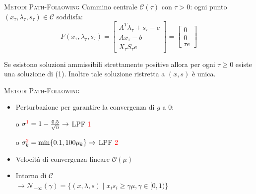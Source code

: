 \begin{frame}[t]{\textsc{\LARGE \textcolor{burntumber}{Metodi Path-Following}}}
	Cammino centrale $\mathcal{C}(\tau)$ con $\tau  > 0$: ogni punto $(x_{\tau}, \lambda_{\tau}, s_{\tau})\in \mathcal{C}$ soddisfa:
\begin{equation}\label{Ftao}\tag{1}
\mathit{F}(x_{\tau},\lambda_{\tau},s_{\tau})= \begin{bmatrix}
A^{T}\lambda_{\tau}+s_{\tau}-c \\Ax_{\tau}-b \\X_{\tau}S_{\tau}e
\end{bmatrix}=\begin{bmatrix}0\\0\\ \tau e \end{bmatrix}
\end{equation}

\begin{theorem}
	Se esistono soluzioni ammissibili strettamente positive allora per ogni $\tau\geq0$ esiste una soluzione di (1). Inoltre tale
	soluzione ristretta a $(x, s)$ è unica.
\end{theorem}
\end{frame}


\begin{frame}{\textsc{\LARGE \textcolor{burntumber}{Metodi Path-Following}}}

\begin{itemize}
	\item Perturbazione per garantire la convergenza di $g$ a $0$:
\end{itemize}
\pause
{}
\pause
\begin{itemize}
	\item[o] $\sigma^{\textcolor{red}{1}} = 1 -\frac{0.5}{\sqrt{n}}\rightarrow$\textrm{ LPF \textcolor{red}{1}}\pause
	\item[o] $\sigma^{\textcolor{red}{2}}_{k} = \min\{0.1, 100\mu_{k}\}\rightarrow$\textrm{ LPF \textcolor{red}{2}}\pause	
\end{itemize}

\begin{itemize}
\item Velocità di convergenza lineare $\mathcal{O}(\mu)$
\pause
\item Intorno di $\mathcal{C}$\\ 
$\rightarrow \mathcal{N}_{-\infty}(\gamma) =\{ (x, \lambda,s)\;|\; x_{i}s_{i} \geq \gamma \mu,  \gamma \in [0,1)\}$
\end{itemize}
\end{frame}

